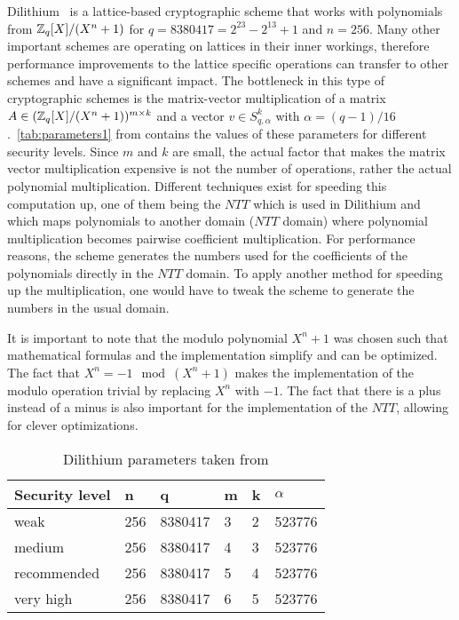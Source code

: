 Dilithium~\parencite{cryptoeprint:2017/633} is a lattice-based cryptographic scheme that works with polynomials from $\mathbb{Z}_q[X]/(X^n + 1)$ for $q = 8380417 = 2^{23} - 2^{13} + 1$ and $n = 256$. Many other important schemes are operating on lattices in their inner workings, therefore performance improvements to the lattice specific operations can transfer to other schemes and have a significant impact. The bottleneck in this type of cryptographic schemes is the matrix-vector multiplication of a matrix $A \in (\mathbb{Z}_q[X]/(X^n + 1))^{m \times k}$ and a vector $v \in S_{q, \alpha}^k$ with $\alpha = (q - 1) / 16$.~\autoref{tab:parameters1} from \parencite*{cryptoeprint:2017/633} contains the values of these parameters for different security levels. Since $m$ and $k$ are small, the actual factor that makes the matrix vector multiplication expensive is not the number of operations, rather the actual polynomial multiplication. Different techniques exist for speeding this computation up, one of them being the $NTT$ which is used in Dilithium and which maps polynomials to another domain ($NTT$ domain) where polynomial multiplication becomes pairwise coefficient multiplication. For performance reasons, the scheme generates the numbers used for the coefficients of the polynomials directly in the $NTT$ domain. To apply another method for speeding up the multiplication, one would have to tweak the scheme to generate the numbers in the usual domain.

It is important to note that the modulo polynomial $X^n + 1$ was chosen such that mathematical formulas and the implementation simplify and can be optimized. The fact that $X^n = -1\ \bmod (X^n + 1)$ makes the implementation of the modulo operation trivial by replacing $X^n$ with $-1$. The fact that there is a plus instead of a minus is also important for the implementation of the $NTT$, allowing for clever optimizations.


\begin{table}[htpb]
    \caption[]{Dilithium parameters taken from \parencite*{cryptoeprint:2017/633} }\label{tab:parameters1}
    \centering
    \begin{tabular}{l l l l l l}
      \toprule
        Security level & n & q & m & k & $\alpha$\\
      \midrule
        weak & 256 & 8380417 & 3 & 2 & 523776 \\
        medium & 256 & 8380417 & 4 & 3 & 523776 \\
        recommended & 256 & 8380417 & 5 & 4 & 523776 \\
        very high & 256 & 8380417 & 6 & 5 & 523776 \\
      \bottomrule
    \end{tabular}
  \end{table}


